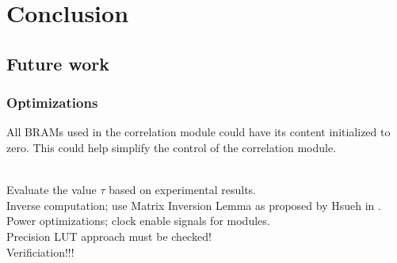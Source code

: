\newpage
\chapter{Conclusion}
\label{sec:conclusion}



%

\section{Future work}

\subsection{Optimizations}

All BRAMs used in the correlation module could have its content initialized to zero. This could help simplify the control of the correlation module.

\\ 
Evaluate the value $\tau$ based on experimental results.\\

Inverse computation; use Matrix Inversion Lemma as proposed by Hsueh in \cite{hsueh_master_thesis}.\\

Power optimizations; clock enable signals for modules.\\

Precision LUT approach must be checked!\\

Verificiation!!!
